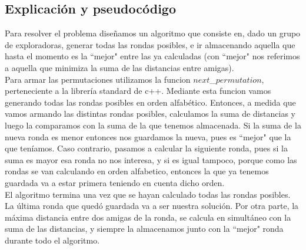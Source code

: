 \subsection{Explicación y pseudocódigo}
Para resolver el problema diseñamos un algoritmo que consiste en, dado un grupo de exploradoras, generar todas las rondas 
posibles, e ir almacenando aquella que hasta el momento es la ``mejor"$ $ entre las ya calculadas (con ``mejor"$ $ nos referimos a aquella que minimiza la suma de las distancias entre amigas).\\

Para armar las permutaciones utilizamos la funcion $next$\_$permutation$, perteneciente a la librería standard de c++. Mediante 
esta funcion vamos generando todas las rondas posibles en orden alfabético. Entonces, a medida que vamos armando las 
distintas rondas posibles, calculamos la suma de distancias y luego la comparamos con la suma de la que tenemos almacenada. Si 
la suma de la nueva ronda es menor entonces nos guardamos la nueva, pues es ``mejor"$ $ que la que teníamos. Caso contrario, 
pasamos a calcular la siguiente ronda, pues si la suma es mayor esa ronda no nos interesa, y si es igual tampoco, porque como
las rondas se van calculando en orden alfabetico, entonces la que ya tenemos guardada va a estar primera teniendo en cuenta
dicho orden. \\

El algoritmo termina una vez que se hayan calculado todas las rondas posibles. La última ronda que quedó guardada va a ser nuestra solución. Por otra parte, la máxima distancia entre dos amigas de la ronda, se calcula en simultáneo con la suma de las distancias, y siempre la almacenamos junto con la ``mejor"$ $ ronda durante todo el algoritmo. \\

